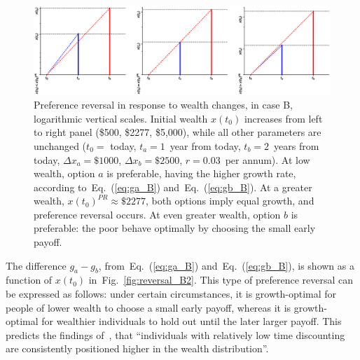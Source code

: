 \documentclass[11pt]{article}
\newcommand{\eref}[1]{Eq.~(\ref{eq:#1})}
\newcommand{\flabel}[1]{\label{fig:#1}}
\newcommand{\fref}[1]{Fig.~\ref{fig:#1}}
\newcommand{\Dx}{\Delta x}
\numberwithin{equation}{section}
\begin{document}
\begin{figure}[!htb]
\centering
\includegraphics[width=1.0\textwidth]{./figures/reversals_B.eps}
\caption{Preference reversal in response to wealth changes, in case B, logarithmic vertical scales. Initial wealth $x(t_0)$ increases from left to right panel (\$500, \$2277, \$5,000), while all other parameters are unchanged ($t_0=$ today, $t_a=1$~year from today, $t_b=2$~years from today, $\Dx_a=\$1000$, $\Dx_b=\$2500$, $r=0.03$~per annum). At low wealth, option $a$ is preferable, having the higher growth rate, according to~\eref{ga_B} and~\eref{gb_B}. At a greater wealth, $x(t_0)^{PR}\approx \$2277$, both options imply equal growth, and preference reversal occurs. At even greater wealth, option $b$ is preferable: the poor behave optimally by choosing the small early payoff.}
\flabel{reversal_B}
\end{figure}


The difference $g_a-g_b$, from~\eref{ga_B} and~\eref{gb_B}, is shown as a function of $x(t_0)$ in~\fref{reversal_B2}. This type of preference reversal can be expressed as follows: under certain circumstances, it is growth-optimal for people of lower wealth to choose a small early payoff, whereas it is growth-optimal for wealthier individuals to hold out until the later larger payoff. This predicts the findings of~\citet{epper2018time}, that ``individuals with relatively low time discounting are consistently positioned higher in the wealth distribution''.
\end{document}
